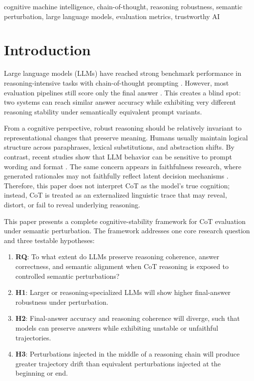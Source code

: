 \documentclass[conference]{IEEEtran}
\begin{document}
\begin{IEEEkeywords}
cognitive machine intelligence, chain-of-thought, reasoning robustness, semantic perturbation, large language models, evaluation metrics, trustworthy AI
\end{IEEEkeywords}

\section{Introduction}
Large language models (LLMs) have reached strong benchmark performance in reasoning-intensive tasks with chain-of-thought prompting \cite{wei2022cot,kojima2022zeroshot,wang2022selfconsistency}. However, most evaluation pipelines still score only the final answer \cite{cobbe2021gsm8k,hendrycks2021math,talmor2019commonsenseqa,talmor2020strategyqa}. This creates a blind spot: two systems can reach similar answer accuracy while exhibiting very different reasoning stability under semantically equivalent prompt variants.

From a cognitive perspective, robust reasoning should be relatively invariant to representational changes that preserve meaning. Humans usually maintain logical structure across paraphrases, lexical substitutions, and abstraction shifts. By contrast, recent studies show that LLM behavior can be sensitive to prompt wording and format \cite{zhao2021calibrate,ribeiro2020checklist,si2023promptbench}. The same concern appears in faithfulness research, where generated rationales may not faithfully reflect latent decision mechanisms \cite{turpin2023unfaithful,lanham2023faithful}. Therefore, this paper does not interpret CoT as the model's true cognition; instead, CoT is treated as an externalized linguistic trace that may reveal, distort, or fail to reveal underlying reasoning.

This paper presents a complete cognitive-stability framework for CoT evaluation under semantic perturbation. The framework addresses one core research question and three testable hypotheses:
\begin{enumerate}[leftmargin=*]
\item \textbf{RQ}: To what extent do LLMs preserve reasoning coherence, answer correctness, and semantic alignment when CoT reasoning is exposed to controlled semantic perturbations?
\item \textbf{H1}: Larger or reasoning-specialized LLMs will show higher final-answer robustness under perturbation.
\item \textbf{H2}: Final-answer accuracy and reasoning coherence will diverge, such that models can preserve answers while exhibiting unstable or unfaithful trajectories.
\item \textbf{H3}: Perturbations injected in the middle of a reasoning chain will produce greater trajectory drift than equivalent perturbations injected at the beginning or end.
\end{enumerate}
\end{document}
